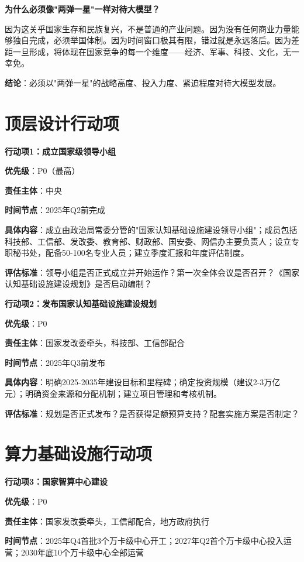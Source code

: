 \textbf{为什么必须像"两弹一星"一样对待大模型？}

因为这关乎国家生存和民族复兴，不是普通的产业问题。因为没有任何商业力量能够独自完成，必须举国体制。因为时间窗口极其有限，错过就是永远落后。因为差距一旦形成，将体现在国家竞争的每一个维度——经济、军事、科技、文化，无一幸免。

\textbf{结论}：必须以"两弹一星"的战略高度、投入力度、紧迫程度对待大模型发展。

\section{顶层设计行动项}

\textbf{行动项1：成立国家级领导小组}

\textbf{优先级}：P0（最高）

\textbf{责任主体}：中央

\textbf{时间节点}：2025年Q2前完成

\textbf{具体内容}：成立由政治局常委分管的"国家认知基础设施建设领导小组"；成员包括科技部、工信部、发改委、教育部、财政部、国安委、网信办主要负责人；设立专职秘书处，配备50-100名专业人员；建立季度汇报和年度评估制度。

\textbf{评估标准}：领导小组是否正式成立并开始运作？第一次全体会议是否召开？《国家认知基础设施建设规划》是否启动编制？

\textbf{行动项2：发布国家认知基础设施建设规划}

\textbf{优先级}：P0

\textbf{责任主体}：国家发改委牵头，科技部、工信部配合

\textbf{时间节点}：2025年Q3前发布

\textbf{具体内容}：明确2025-2035年建设目标和里程碑；确定投资规模（建议2-3万亿元）；明确资金来源和分配机制；建立项目管理和考核机制。

\textbf{评估标准}：规划是否正式发布？是否获得足额预算支持？配套实施方案是否制定？

\section{算力基础设施行动项}

\textbf{行动项3：国家智算中心建设}

\textbf{优先级}：P0

\textbf{责任主体}：国家发改委牵头，工信部配合，地方政府执行

\textbf{时间节点}：2025年Q4首批3个万卡级中心开工；2027年Q2首个万卡级中心投入运营；2030年底10个万卡级中心全部运营

